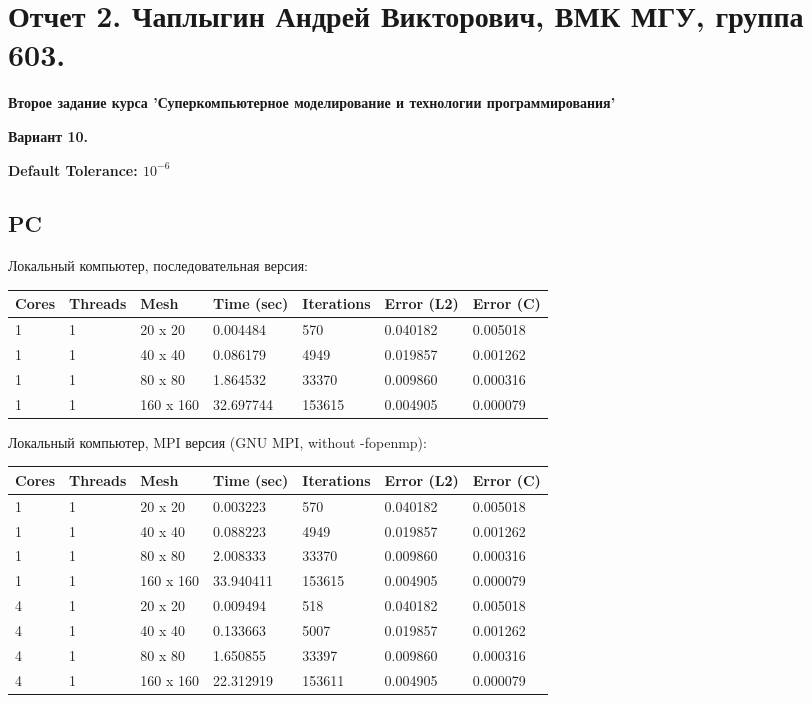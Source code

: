 \documentclass[12pt]{article}
\begin{document}
\section{Отчет 2. Чаплыгин Андрей Викторович, ВМК МГУ, группа 603.}

{\bf Второе задание курса 'Суперкомпьютерное моделирование и технологии программирования'}

{\bf Вариант 10.} 

{\bf Default Tolerance: $10^{-6}$}

\subsection{PC}

Локальный компьютер, последовательная версия:
\begin{center}
\begin{tabular}{lllllll}
Cores & Threads & Mesh & Time (sec) & Iterations & Error (L2) & Error (C) \\
\hline
1 & 1 & 20 x 20 & 0.004484 & 570 & 0.040182 & 0.005018 \\
1 & 1 & 40 x 40 & 0.086179 & 4949 & 0.019857 & 0.001262 \\
1 & 1 & 80 x 80 & 1.864532 & 33370 & 0.009860 & 0.000316 \\
1 & 1 & 160 x 160 & 32.697744 & 153615 & 0.004905 & 0.000079 \\
\hline
\end{tabular}
\end{center}

Локальный компьютер, MPI версия (GNU MPI, without -fopenmp):
\begin{center}
\begin{tabular}{lllllll}
Cores & Threads & Mesh & Time (sec) & Iterations & Error (L2) & Error (C) \\
\hline
1 & 1 & 20 x 20 & 0.003223 & 570 & 0.040182 & 0.005018 \\
1 & 1 & 40 x 40 & 0.088223 & 4949 & 0.019857 & 0.001262 \\
1 & 1 & 80 x 80 & 2.008333 & 33370 & 0.009860 & 0.000316 \\
1 & 1 & 160 x 160 & 33.940411 & 153615 & 0.004905 & 0.000079 \\ 
\hline
4 & 1 & 20 x 20 & 0.009494 & 518 & 0.040182 & 0.005018 \\
4 & 1 & 40 x 40 & 0.133663 & 5007 & 0.019857 & 0.001262 \\
4 & 1 & 80 x 80 & 1.650855 & 33397 & 0.009860 & 0.000316 \\
4 & 1 & 160 x 160 & 22.312919 & 153611 & 0.004905 & 0.000079 \\
\hline
\end{tabular}
\end{center}
\end{document}
